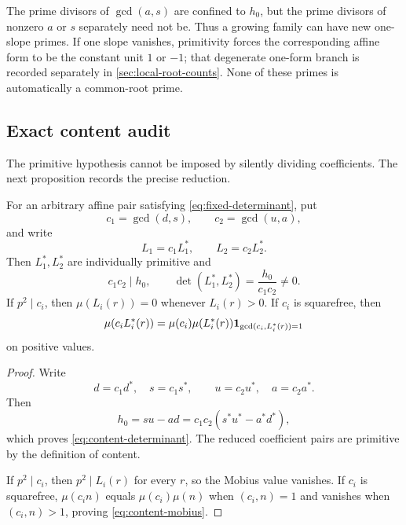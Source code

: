 \begin{remark}
\label{rem:fixed-vs-moving-primes}
The prime divisors of \(\gcd(a,s)\) are confined to \(h_0\), but the
prime divisors of nonzero \(a\) or \(s\) separately need not be.
Thus a growing family can have new one-slope primes.  If one slope
vanishes, primitivity forces the corresponding affine form to be the
constant unit \(1\) or \(-1\); that degenerate one-form branch is
recorded separately in \cref{sec:local-root-counts}.  None of these
primes is automatically a common-root prime.
\end{remark}

\subsection{Exact content audit}

The primitive hypothesis cannot be imposed by silently dividing
coefficients.  The next proposition records the precise reduction.

\begin{proposition}
\label{prop:content-factorization}
For an arbitrary affine pair satisfying
\eqref{eq:fixed-determinant}, put
\[
 c_1=\gcd(d,s),\qquad c_2=\gcd(u,a),
\]
and write
\[
 L_1=c_1L_1^\ast,\qquad L_2=c_2L_2^\ast.
\]
Then \(L_1^\ast,L_2^\ast\) are individually primitive and
\begin{equation}
 c_1c_2\mid h_0,\qquad
 \det(L_1^\ast,L_2^\ast)
 =
 \frac{h_0}{c_1c_2}\ne0.
\label{eq:content-determinant}
\end{equation}
If \(p^2\mid c_i\), then \(\mu(L_i(r))=0\) whenever \(L_i(r)>0\).
If \(c_i\) is squarefree, then
\begin{equation}
 \mu(c_iL_i^\ast(r))
 =
 \mu(c_i)\mu(L_i^\ast(r))
 \mathbf 1_{\gcd(c_i,L_i^\ast(r))=1}
\label{eq:content-mobius}
\end{equation}
on positive values.
\end{proposition}

\begin{proof}
Write
\[
 d=c_1d^\ast,\quad s=c_1s^\ast,\qquad
 u=c_2u^\ast,\quad a=c_2a^\ast.
\]
Then
\[
 h_0=su-ad
 =c_1c_2(s^\ast u^\ast-a^\ast d^\ast),
\]
which proves \eqref{eq:content-determinant}.  The reduced coefficient
pairs are primitive by the definition of content.

If \(p^2\mid c_i\), then \(p^2\mid L_i(r)\) for every \(r\), so the
Mobius value vanishes.  If \(c_i\) is squarefree,
\(\mu(c_in)\) equals \(\mu(c_i)\mu(n)\) when \((c_i,n)=1\) and
vanishes when \((c_i,n)>1\), proving
\eqref{eq:content-mobius}.
\end{proof}

